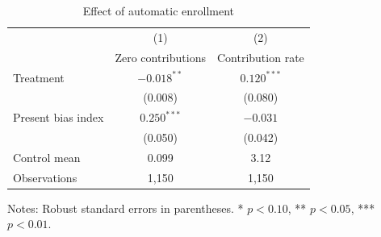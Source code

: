 \begin{table}[t]
\centering
\caption{Effect of automatic enrollment}
\label{tab:main}
\begin{tabular}{lcc}
\toprule
 & (1) & (2) \\
 & Zero contributions & Contribution rate \\
\midrule
Treatment & $-0.018^{**}$ & $0.120^{***}$ \\
 & (0.008) & (0.080) \\
Present bias index & $0.250^{***}$ & $-0.031$ \\
 & (0.050) & (0.042) \\
Control mean & 0.099 & 3.12 \\
Observations & 1,150 & 1,150 \\
\bottomrule
\end{tabular}
\begin{tablenotes}
Notes: Robust standard errors in parentheses. * $p<0.10$, ** $p<0.05$, *** $p<0.01$.
\end{tablenotes}
\end{table}
